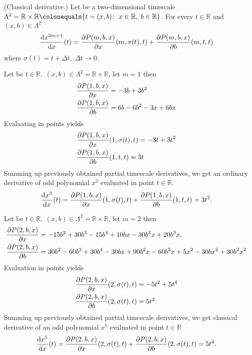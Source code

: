 \begin{cor}
    \label{derivative_case}
    (Classical derivative.)
    Let be a two-dimensional timescale
    $\Lambda^2 = \mathbb{R} \times \mathbb{R} \colonequals \{t=(x, b) \colon \; x\in \mathbb{R}, \; b\in\mathbb{R} \}$.
    For every $t\in\mathbb{R}$ and $(x,b) \in \Lambda^2$
    \begin{align*}
        \odv{x^{2m+1}}{x} (t)
        = \pdv{\polynomialP{m}{b}{x}}{x} (m, \sigma(t), t)
        + \pdv{\polynomialP{m}{b}{x}}{b} (m, t, t)
    \end{align*}
    where $\sigma(t) = t + \Delta t, \; \Delta t \to 0.$
\end{cor}
\begin{examp}
    \label{time_scale_r_example_1}
    Let be $t\in\mathbb{R}, \; (x,b) \in \Lambda^2 = \mathbb{R} \times \mathbb{R}$, let $m=1$ then
    \begin{align*}
        \pdv{P ( 1, b, x )}{x} &= -3 b + 3 b^2 \\
        \pdv{P ( 1, b, x )}{b} &= 6 b - 6 b^2 - 3 x + 6 b x
    \end{align*}
    Evaluating in points yields
    \begin{align*}
        &\pdv{P ( 1, b, x )}{x} (1, \sigma(t), t) = -3t + 3t^2 \\
        &\pdv{P ( 1, b, x )}{b} (1, t, t) = 3t
    \end{align*}
    Summing up previously obtained partial timescale derivatives, we get an ordinary derivative of odd polynomial
    $x^{3}$ evaluated in point $t \in \mathbb{R}$.
    \begin{align*}
        \odv{x^3}{x} (t)
        = \pdv{\polynomialP{1}{b}{x}}{x} (1, \sigma(t), t)
        + \pdv{\polynomialP{1}{b}{x}}{b} (1, t, t)
        = 3t^2.
    \end{align*}
\end{examp}
\begin{examp}
    \label{time_scale_r_example_2}
    Let be $t\in\mathbb{R}, \; (x,b) \in \Lambda^2 = \mathbb{R} \times \mathbb{R}$, let $m=2$ then
    \begin{align*}
        &\pdv{P ( 2, b, x )}{x} = -15 b^2 + 30 b^3 - 15 b^4 + 10 b x - 30 b^2 x + 20 b^3 x, \\
        &\pdv{P ( 2, b, x )}{b} = 30 b^2 - 60 b^3 + 30 b^4 - 30 b x + 90 b^2 x - 60 b^3 x + 5 x^2 - 30 b x^2 + 30 b^2 x^2
    \end{align*}
    Evaluation in points yields
    \begin{align*}
        &\pdv{P ( 2, b, x )}{x} (2, \sigma(t), t) = -5 t^2 + 5 t^4 \\
        &\pdv{P ( 2, b, x )}{b} (2, \sigma(t), t)        = 5 t^2
    \end{align*}
    Summing up previously obtained partial timescale derivatives, we get classical derivative of an odd polynomial
    $x^5$ evaluated in point $t\in\mathbb{R}$
    \begin{align*}
        \odv{x^5}{x} (t)
        = \pdv{\polynomialP{2}{b}{x}}{x} (2, \sigma(t), t)
        + \pdv{\polynomialP{2}{b}{x}}{b} (2, \sigma(t), t)
        = 5t^4.
    \end{align*}
\end{examp}

